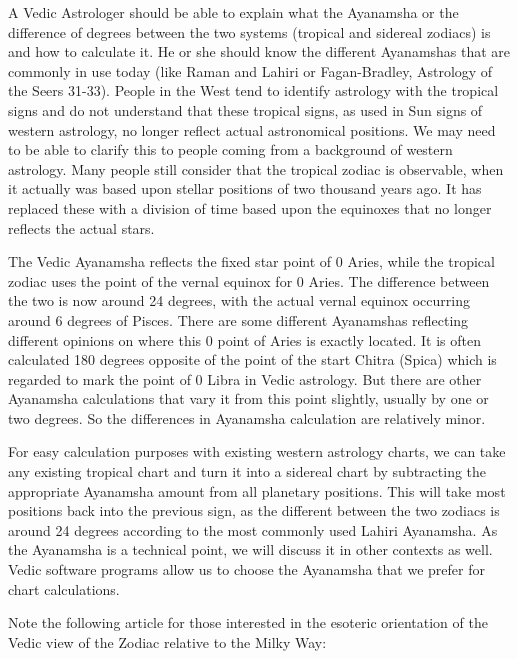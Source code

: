  

A Vedic Astrologer should be able to explain what the Ayanamsha or the difference of degrees between the two systems (tropical and sidereal zodiacs) is and how to calculate it. He or she should know the different Ayanamshas that are commonly in use today (like Raman and Lahiri or Fagan-Bradley, Astrology of the Seers 31-33). People in the West tend to identify astrology with the tropical signs and do not understand that these tropical signs, as used in Sun signs of western astrology, no longer reflect actual astronomical positions. We may need to be able to clarify this to people coming from a background of western astrology. Many people still consider that the tropical zodiac is observable, when it actually was based upon stellar positions of two thousand years ago. It has replaced these with a division of time based upon the equinoxes that no longer reflects the actual stars.

 

The Vedic Ayanamsha reflects the fixed star point of 0 Aries, while the tropical zodiac uses the point of the vernal equinox for 0 Aries. The difference between the two is now around 24 degrees, with the actual vernal equinox occurring around 6 degrees of Pisces. There are some different Ayanamshas reflecting different opinions on where this 0 point of Aries is exactly located. It is often calculated 180 degrees opposite of the point of the start Chitra (Spica) which is regarded to mark the point of 0 Libra in Vedic astrology. But there are other Ayanamsha calculations that vary it from this point slightly, usually by one or two degrees. So the differences in Ayanamsha calculation are relatively minor.

 

For easy calculation purposes with existing western astrology charts, we can take any existing tropical chart and turn it into a sidereal chart by subtracting the appropriate Ayanamsha amount from all planetary positions. This will take most positions back into the previous sign, as the different between the two zodiacs is around 24 degrees according to the most commonly used Lahiri Ayanamsha. As the Ayanamsha is a technical point, we will discuss it in other contexts as well. Vedic software programs allow us to choose the Ayanamsha that we prefer for chart calculations.

 

Note the following article for those interested in the esoteric orientation of the Vedic view of the Zodiac relative to the Milky Way:

